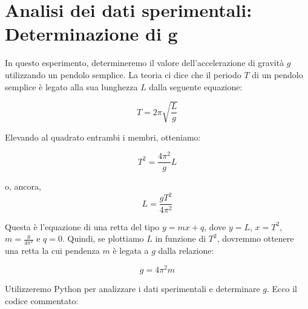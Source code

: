 \documentclass{article}
\begin{document}
\section{Analisi dei dati sperimentali: Determinazione di g}

In questo esperimento, determineremo il valore dell'accelerazione di gravità $g$ utilizzando un pendolo semplice. La teoria ci dice che il periodo $T$ di un pendolo semplice è legato alla sua lunghezza $L$ dalla seguente equazione:

\[ T = 2\pi \sqrt{\frac{L}{g}} \]

Elevando al quadrato entrambi i membri, otteniamo:

\[ T^2 = \frac{4\pi^2}{g}L \]

o, ancora,
\[
L=\frac{g T^2}{4 \pi^2 }
\]

Questa è l'equazione di una retta del tipo $y = mx + q$, dove $y = L$, $x = T^2$, $m = \frac{g}{4\pi^2}$ e $q = 0$. Quindi, se plottiamo $L$ in funzione di $T^2$, dovremmo ottenere una retta la cui pendenza $m$ è legata a $g$ dalla relazione:

\[ g = 4\pi^2m \]

Utilizzeremo Python per analizzare i dati sperimentali e determinare $g$. Ecco il codice commentato:
\end{document}

